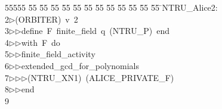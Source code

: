 %
%
\begin{tabbing}
55555 \= 55 \= 55 \= 55 \= 55 \= 55 \= 55 \= 55 \= 55 \= 55 \= 55 \= 55 \= 55 \= \>NTRU\_Alice2:\\[0pt]
2\>$\triangleright$\>(ORBITER)\ v\ 2\ \\[0pt]
3\>$\triangleright$\>$\triangleright$\>define\ F\ finite\_field\ q\ (NTRU\_P)\ end\ \\[0pt]
4\>$\triangleright$\>$\triangleright$\>with\ F\ do\ \\[0pt]
5\>$\triangleright$\>$\triangleright$\>finite\_field\_activity\ \\[0pt]
6\>$\triangleright$\>$\triangleright$\>extended\_gcd\_for\_polynomials\ \\[0pt]
7\>$\triangleright$\>$\triangleright$\>$\triangleright$\>(NTRU\_XN1)\ (ALICE\_PRIVATE\_F)\ \\[0pt]
8\>$\triangleright$\>$\triangleright$\>end\\[0pt]
9\>\end{tabbing}
